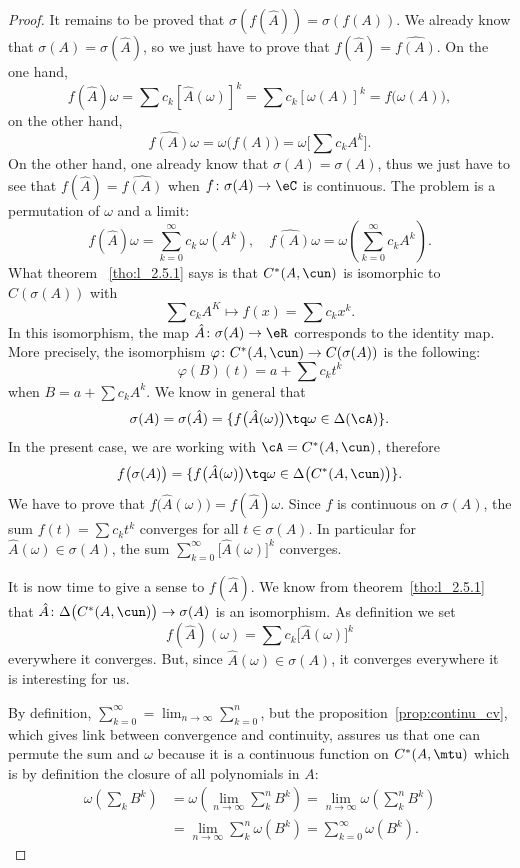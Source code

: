 \begin{proof}
	It remains to be proved that $\sigma(f(\hat{A}))=\sigma(f(A))$. We already know that $\sigma(A)=\sigma(\hat{A})$, so we just have to prove that $f(\hat{A})=\widehat{ f(A) }$. On the one hand,
	\[
		f(\hat{A})\omega=\sum c_k[\hat{A}(\omega)]^k
		=\sum c_k [\omega(A)]^k
		=f\big( \omega(A) \big),
	\]
	on the other hand,
	\[
		\widehat{ f(A) }\omega=\omega\big( f(A) \big)=\omega\big[ \sum c_k A^k \big].
	\]
	On the other hand, one already know that $\sigma(A)=\sigma(A)$, thus we just have to see that
	$f(\hat A)=\widehat{f(A)}$ when $f\colon \sigma(A)\to \eC$ is continuous. The problem is a permutation of $\omega$ and a limit:
	\[
		f(\hat A)\omega=\sum_{k=0}^{\infty} c_k\,\omega(A^k),\quad\widehat{f(A)}\omega=\omega\left(\sum_{k=0}^{\infty} c_kA^k\right).
	\]
	What theorem ~\ref{tho:l_2.5.1} says is that $C^*(A,\cun)$ is isomorphic to $C(\sigma(A))$ with
	\[
		\sum c_kA^K\mapsto f(x)=\sum c_kx^k.
	\]
	In this isomorphism, the map $\hat{A}\colon \sigma(A)\to \eR$ corresponds to the identity map. More precisely, the isomorphism $\varphi\colon C^*(A,\cun)\to C(\sigma(A))$ is the following:
	\[
		\varphi(B)(t)=a+\sum c_kt^k
	\]
	when $B=a+\sum c_kA^k$. We know in general that
	\[
		\sigma(A)=\sigma(\hat{A})=\{ f\big( \hat{A}(\omega) \big)\tq\omega\in\Delta(\cA) \}.
	\]
	In the present case, we are working with $\cA=C^*(A,\cun)$, therefore
	\[
		f\big( \sigma(A) \big)=\{ f\big( \hat{A}(\omega) \big)\tq \omega\in\Delta\big( C^*(A,\cun) \big) \}.
	\]
	We have to prove that $f\big( \hat{A}(\omega) \big)=f(\hat{A})\omega$. Since $f$ is continuous on $\sigma(A)$, the sum $f(t)=\sum c_kt^k$ converges for all $t\in\sigma(A)$. In particular for $\hat{A}(\omega)\in\sigma(A)$, the sum $\sum_{k=0}^{\infty}\big[ \hat{A}(\omega) \big]^k$ converges.

	It is now time to give a sense to $f(\hat{A})$. We know from theorem~\ref{tho:l_2.5.1} that $\hat{A}\colon \Delta\big( C^*(A,\cun) \big) \to\sigma(A) $ is an isomorphism. As definition we set
	\begin{equation}
		f(\hat{A})(\omega)=\sum c_k\big[ \hat{A}(\omega) \big]^k
	\end{equation}
	everywhere it converges. But, since $\hat{A}(\omega)\in\sigma(A)$, it converges everywhere it is interesting for us.

	By definition, $\sum_{k=0}^{\infty}=\lim_{n\to\infty}\sum_{k=0}^{n}$, but the proposition~\ref{prop:continu_cv}, which gives link between convergence and continuity, assures us that one can permute the sum and $\omega$ because it is a continuous function on $C^*(A,\mtu)$ which is by definition the closure of all polynomials in $A$:
	\begin{equation}
		\begin{split}
			\omega(\sum_k B^k)&=\omega(\lim_{n\to\infty}\sum_k^n B^k)
			=\lim_{n\to\infty}\omega(\sum_k^n B^k)\\
			&=\lim_{n\to\infty}\sum_k^n\omega(B^k)
			=\sum_{k=0}^{\infty}\omega(B^k).
		\end{split}
	\end{equation}



\end{proof}
